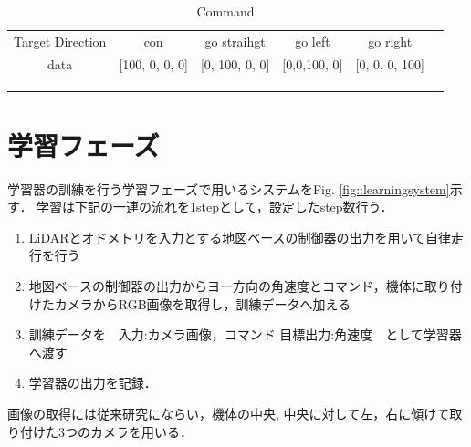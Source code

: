     \begin{table}[h]
      \centering
      \caption{Command}
      \begin{tabular}{ccccll}
      \cline{1-5}
      \multicolumn{1}{|c|}{Target Direction} & \multicolumn{1}{c|}{con}&\multicolumn{1}{c|}{go straihgt}          & \multicolumn{1}{c|}{go left}          & \multicolumn{1}{c|}{go right}          &  \\ \cline{1-5}
      \multicolumn{1}{|c|}{data}  &\multicolumn{1}{c|}{{[}100, 0, 0, 0{]}}& \multicolumn{1}{c|}{{[}0, 100, 0, 0{]}} & \multicolumn{1}{c|}{{[}0,0,100, 0{]}} & \multicolumn{1}{l|}{{[}0, 0, 0, 100{]}} &  \\ \cline{1-5}
                                 &                                  &                                  &                                  &  \\
                                 &                                  &                                  &                                  &  \\
      \multicolumn{1}{l}{}       &                                  &                                  &                                  & 
      \end{tabular}
      \vspace{-3.0zh}
      \label{tb:command_4}
      \end{table}

\newpage

\section{学習フェーズ}
\label{lerning}
学習器の訓練を行う学習フェーズで用いるシステムをFig. \ref{fig::learningsystem}示す．
学習は下記の一連の流れを1stepとして，設定したstep数行う．
\begin{enumerate}
    \item LiDARとオドメトリを入力とする地図ベースの制御器の出力を用いて自律走行を行う
    \item 地図ベースの制御器の出力からヨー方向の角速度とコマンド，機体に取り付けたカメラからRGB画像を取得し，訓練データへ加える
    \item 訓練データを　入力:カメラ画像，コマンド 目標出力:角速度　として学習器へ渡す
    \item 学習器の出力を記録．
  \end{enumerate}
画像の取得には従来研究\cite{okada}にならい，機体の中央, 中央に対して左，右に傾けて取り付けた3つのカメラを用いる．

